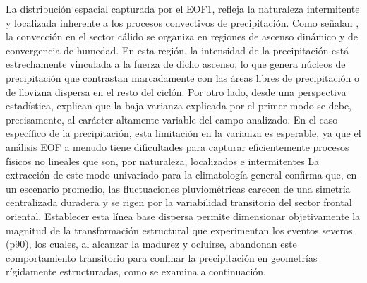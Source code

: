 La distribución espacial capturada por el EOF1, refleja la naturaleza intermitente y localizada inherente a los procesos convectivos de precipitación. Como señalan \citet{naud2020evaluation}, la convección en el sector cálido se organiza en regiones de ascenso dinámico y de convergencia de humedad. En esta región, la intensidad de la precipitación está estrechamente vinculada a la fuerza de dicho ascenso, lo que genera núcleos de precipitación que contrastan marcadamente con las áreas libres de precipitación o de llovizna dispersa en el resto del ciclón. Por otro lado, desde una perspectiva estadística, \citet{hannachi2007empirical} explican que la baja varianza explicada por el primer modo se debe, precisamente, al carácter altamente variable del campo analizado. En el caso específico de la precipitación, esta limitación en la varianza es esperable, ya que el análisis EOF a menudo tiene dificultades para capturar eficientemente procesos físicos no lineales que son, por naturaleza, localizados e intermitentes
%
La extracción de este modo univariado para la climatología general confirma que, en un escenario promedio, las fluctuaciones pluviométricas carecen de una simetría centralizada duradera y se rigen por la variabilidad transitoria del sector frontal oriental. Establecer esta línea base dispersa permite dimensionar objetivamente la magnitud de la transformación estructural que experimentan los eventos severos (p90), los cuales, al alcanzar la madurez y ocluirse, abandonan este comportamiento transitorio para confinar la precipitación en geometrías rígidamente estructuradas, como se examina a continuación.

% 
